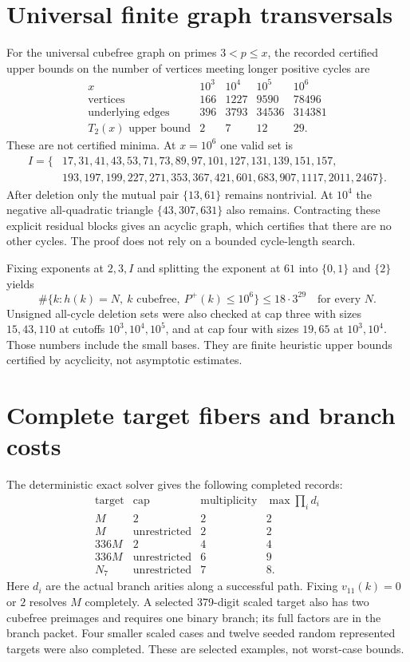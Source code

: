 \section{Universal finite graph transversals}
For the universal cubefree graph on primes $3<p\le x$, the recorded certified
upper bounds on the number of vertices meeting longer positive cycles are
\[
\begin{array}{c|rrrr}
x&10^3&10^4&10^5&10^6\\\hline
\text{vertices}&166&1227&9590&78496\\
\text{underlying edges}&396&3793&34536&314381\\
T_2(x)\text{ upper bound}&2&7&12&29.
\end{array}
\]
These are not certified minima. At $x=10^6$ one valid set is
\begin{align*}
 I=\{&17,31,41,43,53,71,73,89,97,101,127,131,139,151,157,\\
 &193,197,199,227,271,353,367,421,601,683,907,1117,2011,2467\}.
\end{align*}
After deletion only the mutual pair $\{13,61\}$ remains nontrivial. At $10^4$
the negative all-quadratic triangle $\{43,307,631\}$ also remains. Contracting
these explicit residual blocks gives an acyclic graph, which certifies that
there are no other cycles. The proof does not rely on a bounded cycle-length
search.

Fixing exponents at $2,3,I$ and splitting the exponent at $61$ into
$\{0,1\}$ and $\{2\}$ yields
\[
 \#\{k:h(k)=N,\ k\text{ cubefree},\ P^+(k)\le10^6\}
 \le18\cdot3^{29}\quad\text{for every }N.
\]
Unsigned all-cycle deletion sets were also checked at cap three with sizes
$15,43,110$ at cutoffs $10^3,10^4,10^5$, and at cap four with sizes $19,65$
at $10^3,10^4$. Those numbers include the small bases. They are finite heuristic
upper bounds certified by acyclicity, not asymptotic estimates.

\section{Complete target fibers and branch costs}
The deterministic exact solver gives the following completed records:
\[
\begin{array}{c|c|c|c}
\text{target}&\text{cap}&\text{multiplicity}&\max\prod_i d_i\\\hline
M&2&2&2\\
M&\text{unrestricted}&2&2\\
336M&2&4&4\\
336M&\text{unrestricted}&6&9\\
N_7&\text{unrestricted}&7&8.
\end{array}
\]
Here $d_i$ are the actual branch arities along a successful path. Fixing
$v_{11}(k)=0$ or $2$ resolves $M$ completely. A selected 379-digit scaled
target also has two cubefree preimages and requires one binary branch; its
full factors are in the branch packet. Four smaller scaled cases and twelve
seeded random represented targets were also completed. These are selected
examples, not worst-case bounds.

